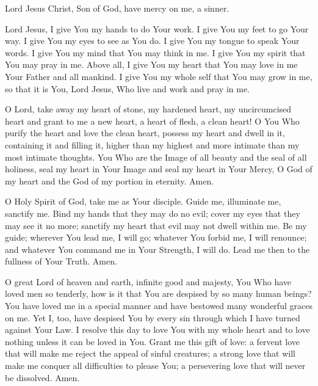 \label{prayer:Jesus}
Lord Jesus Christ, Son of God, have mercy on me, a sinner.

Lord Jesus,
I give You my hands to do Your work.
I give You my feet to go Your way.
I give You my eyes to see as You do.
I give You my tongue to speak Your words.
I give You my mind that You may think in me.
I give You my spirit that You may pray in me.
Above all, I give You my heart that You may love in me Your Father and all mankind.
I give You my whole self that You may grow in me, so that it is You, Lord Jesus,
Who live and work and pray in me.

\label{prayer:take_heart_of_stone}
O Lord, take away my heart of stone, my hardened heart, my uncircumcised heart and grant to me a new heart, a heart of flesh, a clean heart!
O You Who purify the heart and love the clean heart, possess my heart and dwell in it, containing it and filling it, higher than my highest and more intimate than my most intimate thoughts.
You Who are the Image of all beauty and the seal of all holiness, seal my heart in Your Image and seal my heart in Your Mercy, O God of my heart and the God of my portion in eternity.
Amen.

O Holy Spirit of God, take me as Your disciple.
Guide me, illuminate me, sanctify me.
Bind my hands that they may do no evil;
cover my eyes that they may see it no more;
sanctify my heart that evil may not dwell within me.
Be my guide;
wherever You lead me, I will go;
whatever You forbid me, I will renounce;
and whatever You command me in Your Strength, I will do.
Lead me then to the fullness of Your Truth.
Amen.

O great Lord of heaven and earth, infinite good and majesty, You Who have loved men so tenderly, how is it that You are despised by so many human beings?
You have loved me in a special manner and have bestowed many wonderful graces on me.
Yet I, too, have despised You by every sin through which I have turned against Your Law.
I resolve this day to love You with my whole heart and to love nothing unless it can be loved in You.
Grant me this gift of love:
a fervent love that will make me reject the appeal of sinful creatures;
a strong love that will make me conquer all difficulties to please You;
a persevering love that will never be dissolved.
Amen.

